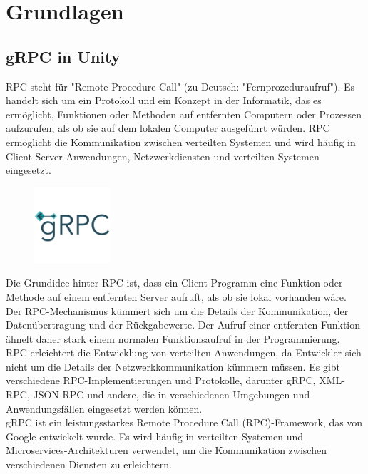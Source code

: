 \chapter{Grundlagen}
\section{gRPC in Unity}
RPC steht für "Remote Procedure Call" (zu Deutsch: "Fernprozeduraufruf"). Es handelt sich um ein Protokoll und ein Konzept in der Informatik, das es ermöglicht, Funktionen oder Methoden auf entfernten Computern oder Prozessen aufzurufen, als ob sie auf dem lokalen Computer ausgeführt würden. RPC ermöglicht die Kommunikation zwischen verteilten Systemen und wird häufig in Client-Server-Anwendungen, Netzwerkdiensten und verteilten Systemen eingesetzt.\cite{Bengel.2004}\\

\begin{figure} %
    \centering
    \includegraphics[width=0.25\textwidth]{images/grpc-icon-color.png}
\end{figure}
Die Grundidee hinter RPC ist, dass ein Client-Programm eine Funktion oder Methode auf einem entfernten Server aufruft, als ob sie lokal vorhanden wäre. Der RPC-Mechanismus kümmert sich um die Details der Kommunikation, der Datenübertragung und der Rückgabewerte. Der Aufruf einer entfernten Funktion ähnelt daher stark einem normalen Funktionsaufruf in der Programmierung.\cite{Bengel.2004}\\

RPC erleichtert die Entwicklung von verteilten Anwendungen, da Entwickler sich nicht um die Details der Netzwerkkommunikation kümmern müssen. Es gibt verschiedene RPC-Implementierungen und Protokolle, darunter gRPC, XML-RPC, JSON-RPC und andere, die in verschiedenen Umgebungen und Anwendungsfällen eingesetzt werden können.\cite{Bengel.2004}\\


gRPC ist ein leistungsstarkes Remote Procedure Call (RPC)-Framework, das von Google entwickelt wurde. Es wird häufig in verteilten Systemen und Microservices-Architekturen verwendet, um die Kommunikation zwischen verschiedenen Diensten zu erleichtern.\\

